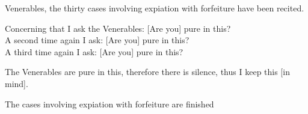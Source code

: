 \medskip

\begin{center}
	Venerables, the thirty cases involving expiation with forfeiture have been recited.

	\smallskip

	Concerning that I ask the Venerables: [Are you] pure in this?\\
	A second time again I ask: [Are you] pure in this?\\
	A third time again I ask: [Are you] pure in this?

	\smallskip

	The Venerables are pure in this, therefore there is silence, thus I keep this [in mind].
\end{center}

\begin{outro}
	The cases involving expiation with forfeiture are finished
\end{outro}

\clearpage


